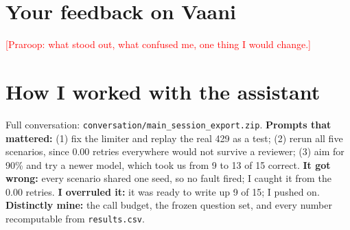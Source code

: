 \documentclass[10pt]{extarticle}
\newcommand{\code}[1]{\texttt{\small #1}}
\begin{document}
\section*{Your feedback on Vaani}
\textcolor{red}{[Praroop: what stood out, what confused me, one thing I would change.]}

\section*{How I worked with the assistant}
Full conversation: \code{conversation/main\_session\_export.zip}. \textbf{Prompts that mattered:} (1) fix the limiter and replay the real 429 as a test; (2) rerun all five scenarios, since 0.00 retries everywhere would not survive a reviewer; (3) aim for 90\% and try a newer model, which took us from 9 to 13 of 15 correct. \textbf{It got wrong:} every scenario shared one seed, so no fault fired; I caught it from the 0.00 retries. \textbf{I overruled it:} it was ready to write up 9 of 15; I pushed on. \textbf{Distinctly mine:} the call budget, the frozen question set, and every number recomputable from \code{results.csv}.
\end{document}
